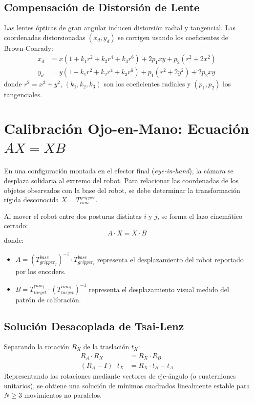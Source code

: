 \documentclass[11pt,a4paper]{article}
\begin{document}
\subsection{Compensación de Distorsión de Lente}
Las lentes ópticas de gran angular inducen distorsión radial y tangencial. Las coordenadas distorsionadas $(x_d, y_d)$ se corrigen usando los coeficientes de Brown-Conrady:
\begin{align}
x_d &= x (1 + k_1 r^2 + k_2 r^4 + k_3 r^6) + 2 p_1 x y + p_2 (r^2 + 2x^2) \\
y_d &= y (1 + k_1 r^2 + k_2 r^4 + k_3 r^6) + p_1 (r^2 + 2y^2) + 2 p_2 x y
\end{align}
donde $r^2 = x^2 + y^2$, $(k_1, k_2, k_3)$ son los coeficientes radiales y $(p_1, p_2)$ los tangenciales.

\section{Calibración Ojo-en-Mano: Ecuación $AX = XB$}
En una configuración montada en el efector final (\textit{eye-in-hand}), la cámara se desplaza solidaria al extremo del robot. Para relacionar las coordenadas de los objetos observados con la base del robot, se debe determinar la transformación rígida desconocida $X = T_{cam}^{gripper}$.

Al mover el robot entre dos posturas distintas $i$ y $j$, se forma el lazo cinemático cerrado:
\begin{equation}
A \cdot X = X \cdot B
\end{equation}
donde:
\begin{itemize}
    \item $A = (T_{gripper_j}^{base})^{-1} \cdot T_{gripper_i}^{base}$ representa el desplazamiento del robot reportado por los encoders.
    \item $B = T_{target}^{cam_j} \cdot (T_{target}^{cam_i})^{-1}$ representa el desplazamiento visual medido del patrón de calibración.
\end{itemize}

\subsection{Solución Desacoplada de Tsai-Lenz}
Separando la rotación $R_X$ de la traslación $t_X$:
\begin{align}
R_A \cdot R_X &= R_X \cdot R_B \\
(R_A - I) \cdot t_X &= R_X \cdot t_B - t_A
\end{align}
Representando las rotaciones mediante vectores de eje-ángulo (o cuaterniones unitarios), se obtiene una solución de mínimos cuadrados linealmente estable para $N \ge 3$ movimientos no paralelos.
\end{document}
